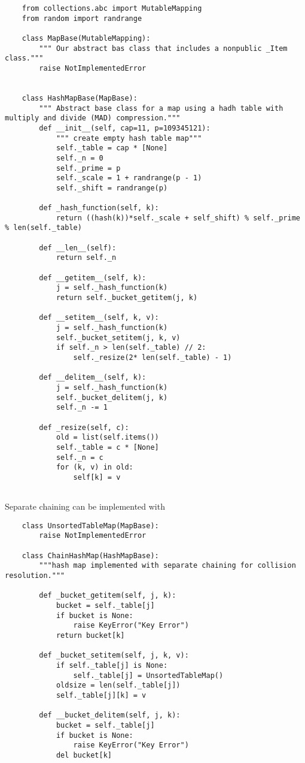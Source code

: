 \documentclass[]{article}
\begin{document}
\begin{lstlisting}
	from collections.abc import MutableMapping
	from random import randrange
	
	class MapBase(MutableMapping):
		""" Our abstract bas class that includes a nonpublic _Item class."""
		raise NotImplementedError
		
		
	class HashMapBase(MapBase):
		""" Abstract base class for a map using a hadh table with multiply and divide (MAD) compression."""
		def __init__(self, cap=11, p=109345121):
			""" create empty hash table map"""
			self._table = cap * [None]
			self._n = 0
			self._prime = p
			self._scale = 1 + randrange(p - 1)
			self._shift = randrange(p)
		
		def _hash_function(self, k):
			return ((hash(k))*self._scale + self_shift) % self._prime % len(self._table)
			
		def __len__(self):
			return self._n
			
		def __getitem__(self, k):
			j = self._hash_function(k)
			return self._bucket_getitem(j, k)
			
		def __setitem__(self, k, v):
			j = self._hash_function(k)
			self._bucket_setitem(j, k, v)
			if self._n > len(self._table) // 2:
				self._resize(2* len(self._table) - 1)
		
		def __delitem__(self, k):
			j = self._hash_function(k)
			self._bucket_delitem(j, k)
			self._n -= 1
			
		def _resize(self, c):
			old = list(self.items())
			self._table = c * [None]
			self._n = c
			for (k, v) in old:
				self[k] = v
		
\end{lstlisting}\bigbreak

Separate chaining can be implemented with

\begin{lstlisting}
	class UnsortedTableMap(MapBase):
		raise NotImplementedError
	
	class ChainHashMap(HashMapBase):
		"""hash map implemented with separate chaining for collision resolution."""
		
		def _bucket_getitem(self, j, k):
			bucket = self._table[j]
			if bucket is None:
				raise KeyError("Key Error")
			return bucket[k]
			
		def _bucket_setitem(self, j, k, v):
			if self._table[j] is None:
				self._table[j] = UnsortedTableMap()
			oldsize = len(self._table[j])
			self._table[j][k] = v
			
		def __bucket_delitem(self, j, k):
			bucket = self._table[j]
			if bucket is None:
				raise KeyError("Key Error")
			del bucket[k]
		
\end{lstlisting}\bigbreak
\end{document}

